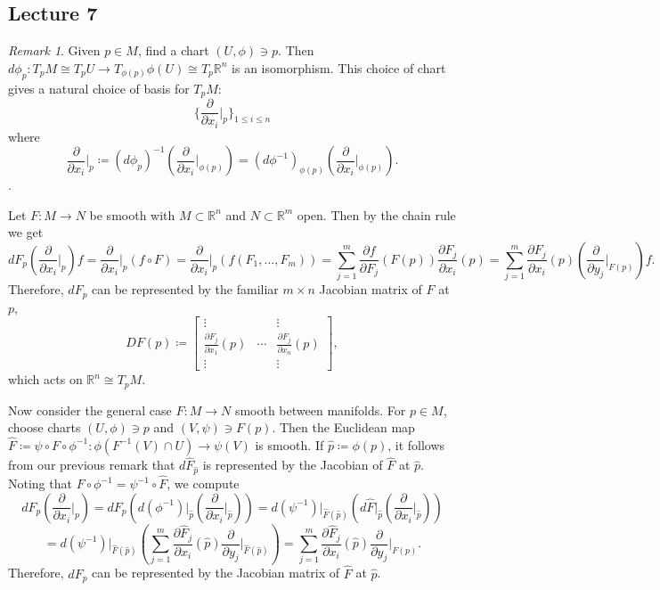 \documentclass[10pt,letterpaper,cm]{nupset}
\theoremstyle{definition}
\theoremstyle{theorem}
\theoremstyle{remark}
\newtheorem{remark}[definition]{Remark}
\newcommand{\R}{\mathbb R}
\newcommand{\1}{\mathbf{1}}
\newcommand{\0}{\vec 0}
\begin{document}
\subsection{Lecture 7}

\begin{remark}
Given $p\in M$, find a chart $(U, \phi)\ni p$. Then $d\phi_p : T_pM \cong T_pU\to T_{\phi(p)}\phi(U) \cong T_p \R^n$ is an isomorphism. This choice of chart gives a natural choice of basis for $T_pM$: $$\{\frac{\partial}{\partial{x_i}}\rvert_{p} \}_{1\leq i \leq n}$$ where $$\frac{\partial}{\partial{x_i}}\rvert_{p}\coloneqq  (d\phi_p)^{-1}(\frac{\partial}{\partial{x_i}}\rvert_{\phi(p)}) = (d\phi^{-1})_{\phi(p)}(\frac{\partial}{\partial{x_i}}\rvert_{\phi(p)}).$$.
\end{remark}

Let $F: M \to N$ be smooth with $M\subset \R^n$ and $N \subset \R^m$ open. Then by the chain rule we get 
$$dF_p(\frac{\partial}{\partial{x_i}}\rvert_{p})f = \frac{\partial}{\partial{x_i}}\rvert_{p}(f \circ F) = \frac{\partial}{\partial{x_i}}\rvert_{p}(f(F_1, \ldots, F_m)) =\sum_{j=1}^m  \frac{\partial{f}}{\partial{F_j}}(F(p))\frac{\partial{F_j}}{\partial{x_i}}(p)= \sum_{j=1}^m \frac{\partial{F_j}}{\partial{x_i}}(p) (\frac{\partial}{\partial{y_j}}\rvert_{F(p)})f.$$ Therefore, $dF_p$ can be represented by the familiar $m\times n$ Jacobian matrix of $F$ at $p$, 
 $$DF(p) \coloneqq  \begin{bmatrix}  \vdots & & \vdots \\ \frac{\partial{F_j}}{\partial{x_1}}(p)  & \cdots & \frac{\partial{F_j}}{\partial{x_n}}(p)  \\ \vdots & & \vdots  
\end{bmatrix},$$ which acts on $\R^n \cong T_pM$.

Now consider the general case $F: M \to N$ smooth between manifolds. For $p \in M$, choose charts $(U, \phi) \ni p$ and $(V, \psi) \ni F(p)$. Then the Euclidean map $\hat{F}\coloneqq  \psi \circ F \circ \phi^{-1} : \phi(F^{-1}(V) \cap U) \to \psi(V)$ is smooth. If $\hat{p}\coloneqq  \phi(p)$, it follows from our previous remark that $d\hat{F}_{\hat{p}}$ is represented by the Jacobian of $\hat{F}$ at $\hat{p}$. Noting that $F \circ \phi^{-1} = \psi^{-1} \circ \hat{F}$, we compute
$$dF_p(\frac{\partial}{\partial{x_i}}\rvert_p) =  dF_p(d(\phi^{-1})\rvert_{\hat{p}}(\frac{\partial}{\partial{x_i}}\rvert_{\hat{p}})) = d(\psi^{-1})\rvert_{\hat{F}(\hat{p})}(d\hat{F}\rvert_{\hat{p}}(\frac{\partial}{\partial{x_i}}\rvert_{\hat{p}}))$$
$$= d(\psi^{-1})\rvert_{\hat{F}(\hat{p})}\left(\sum_{j=1}^m \frac{\partial{\hat{F}_j}}{\partial{x_i}}(\hat{p})\frac{\partial}{\partial{y_j}}\rvert_{\hat{F}(\hat{p})}\right) = 
\sum_{j=1}^m \frac{\partial{\hat{F}_j}}{\partial{x_i}}(\hat{p})\frac{\partial}{\partial{y_j}}\rvert_{F(p)}.
$$
Therefore, $dF_p$ can be represented by the Jacobian matrix of $\hat{F}$ at $\hat{p}$. 
\end{document}
